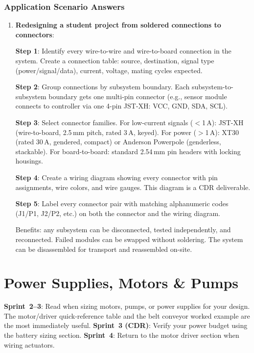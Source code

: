 \documentclass[11pt,letterpaper,twoside,openany]{book}
\begin{document}
\subsection{Application Scenario Answers}
\begin{enumerate}[leftmargin=1.5em, start=11]
\item \textbf{Redesigning a student project from soldered connections to connectors}:

\textbf{Step 1}: Identify every wire-to-wire and wire-to-board connection in the system. Create a connection table: source, destination, signal type (power/signal/data), current, voltage, mating cycles expected.

\textbf{Step 2}: Group connections by subsystem boundary. Each subsystem-to-subsystem boundary gets one multi-pin connector (e.g., sensor module connects to controller via one 4-pin JST-XH: VCC, GND, SDA, SCL).

\textbf{Step 3}: Select connector families. For low-current signals ($<$1\,A): JST-XH (wire-to-board, 2.5\,mm pitch, rated 3\,A, keyed). For power ($>$1\,A): XT30 (rated 30\,A, gendered, compact) or Anderson Powerpole (genderless, stackable). For board-to-board: standard 2.54\,mm pin headers with locking housings.

\textbf{Step 4}: Create a wiring diagram showing every connector with pin assignments, wire colors, and wire gauges. This diagram is a CDR deliverable.

\textbf{Step 5}: Label every connector pair with matching alphanumeric codes (J1/P1, J2/P2, etc.) on both the connector and the wiring diagram.

Benefits: any subsystem can be disconnected, tested independently, and reconnected. Failed modules can be swapped without soldering. The system can be disassembled for transport and reassembled on-site.
\end{enumerate}

\chapter{Power Supplies, Motors \& Pumps}\label{ch:motors}

\begin{tipbox}
\textbf{Sprint~2--3}: Read when sizing motors, pumps, or power supplies for your design. The motor/driver quick-reference table and the belt conveyor worked example are the most immediately useful. \textbf{Sprint~3 (CDR)}: Verify your power budget using the battery sizing section. \textbf{Sprint~4}: Return to the motor driver section when wiring actuators.
\end{tipbox}
\end{document}
